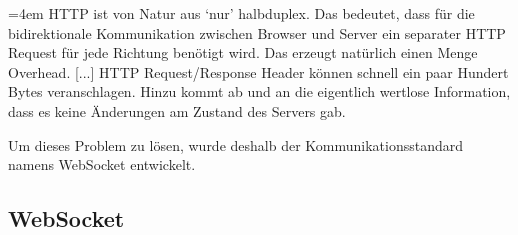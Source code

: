\par
\begingroup
\leftskip=4em %
\rightskip\leftskip
\noindent \glqq HTTP ist von Natur aus ‘nur’ halbduplex. Das bedeutet, dass für die bidirektionale Kommunikation zwischen Browser und Server ein separater HTTP Request für jede Richtung benötigt wird. Das erzeugt natürlich einen Menge Overhead. [...] HTTP Request/Response Header können schnell ein paar Hundert Bytes veranschlagen. Hinzu kommt ab und an die eigentlich wertlose Information, dass es keine Änderungen am Zustand des Servers gab.\grqq{} \cite{Matt2011}
\par
\endgroup
\bigskip
Um dieses Problem zu lösen, wurde deshalb der Kommunikationsstandard namens WebSocket entwickelt.

\subsection{WebSocket}
\label{sec:websocket}


